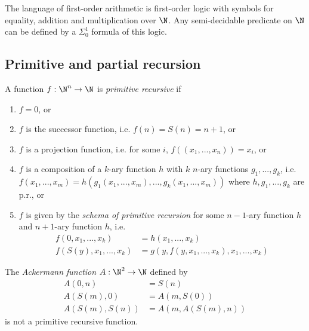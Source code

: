 \documentclass{article}
\begin{document}
\begin{theorem}
    The language of first-order arithmetic is first-order logic with symbols for 
    equality, addition and multiplication over $\N$. Any semi-decidable predicate on
    $\N$ can be defined by a $\Sigma_0^1$ formula of this logic.
\end{theorem}

\subsection{Primitive and partial recursion}

\begin{definition}
    A function $f:\N^n\to\N$ is \emph{primitive recursive} if
    \begin{enumerate}[label=R\arabic*.]
        \item $f=0$, or
        \item $f$ is the successor function, i.e. $f(n)=S(n)=n+1$, or 
        \item $f$ is a projection function, i.e. for some $i$, $f((x_1,...,x_n))=x_i$, or 
        \item $f$ is a composition of a $k$-ary function $h$ with $k$ $n$-ary functions $g_1,...,g_k$, i.e.
            $f(x_1,...,x_m)=h(g_1(x_1,...,x_m),...,g_k(x_1,...,x_m))$ where $h,g_1,...,g_k$ are p.r., or 
        \item $f$ is given by the \emph{schema of primitive recursion} for some $n-1$-ary function $h$ and 
            $n+1$-ary function $h$, i.e. 
            \begin{align*}
                f(0,x_1,...,x_k)    &= h(x_1,...,x_k)\\
                f(S(y),x_1,...,x_k) &= g(y,f(y,x_1,...,x_k),x_1,...,x_k)
            \end{align*}
    \end{enumerate}
\end{definition}

\begin{theorem}[Notes I.43]
    The \emph{Ackermann function} $A:\N^2\to\N$ defined by 
    \begin{align*}
        A(0,n) &= S(n) \\
        A(S(m), 0) &= A(m,S(0)) \\
        A(S(m), S(n)) &= A(m, A(S(m), n))
    \end{align*}
    is not a primitive recursive function.
\end{theorem}
\end{document}
